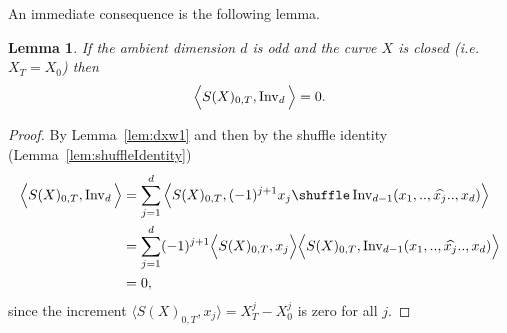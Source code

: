 \documentclass{scrartcl}
\theoremstyle{plain}
\newtheorem{lemma}[theorem]{Lemma}
\theoremstyle{definition}
\newcommand{\1}[1]{1_{\{#1\}}}
\newcommand{\ds}{d} %
\begin{document}
An immediate consequence is the following lemma.
\begin{lemma}
  \label{lem:closedCurveOddDimension}
  If the ambient dimension $\ds$ is odd and the curve $X$ is closed (i.e. $X_T = X_0$) then
  \begin{align*}
    \Big\langle S(X)_{0,T}, \firstInvariant\ds \Big\rangle = 0.
  \end{align*}
\end{lemma}
\begin{proof}
  By Lemma~\ref{lem:dxw1} and then by the shuffle identity (Lemma~\ref{lem:shuffleIdentity})
  \begin{align*}
    \Big\langle S(X)_{0,T}, \firstInvariant\ds \Big\rangle
    &=
    \sum_{j=1}^d
    \Big\langle S(X)_{0,T}, 
    (-1)^{j+1}
    x_j \shuffle \firstInvariant{\ds-1}( x_1, .., \widehat{x_j} .., x_\ds )  \Big\rangle \\
    &=
    \sum_{j=1}^d
    (-1)^{j+1}
    \Big\langle S(X)_{0,T}, x_j \Big\rangle
    \Big\langle S(X)_{0,T}, \firstInvariant{\ds-1}( x_1, .., \widehat{x_j} .., x_\ds )  \Big\rangle \\
    &= 0,
  \end{align*}
  since the increment $\Big\langle S(X)_{0,T}, x_j \Big\rangle = X^j_T - X^j_0$ is zero for all $j$.
\end{proof}
\end{document}
